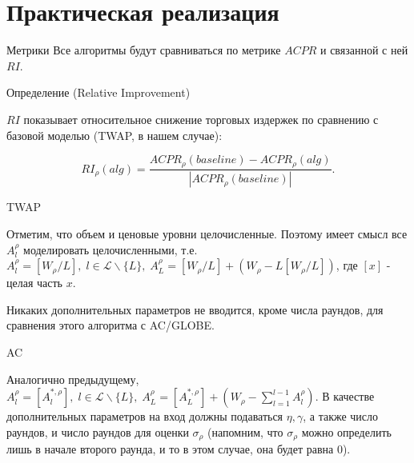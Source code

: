 \documentclass[aspectratio=169]{beamer}
\begin{document}
    \section{Практическая реализация}

        \begin{frame}{Метрики}
            Все алгоритмы будут сравниваться по метрике $ACPR$ и связанной с ней $RI$.

            \begin{block}{Определение (Relative Improvement)}

                $RI$ показывает относительное снижение торговых
                издержек по сравнению с базовой моделью (TWAP, в нашем случае):
        
                \begin{equation*}
                    RI_\rho(alg) = \frac{ACPR_\rho(baseline) - ACPR_{\rho}(alg)  }{|ACPR_\rho(baseline)|}.
                \end{equation*}
                
            \end{block}
            
        \end{frame}
        
        \begin{frame}{TWAP}
        
            Отметим, что объем и ценовые уровни целочисленные. Поэтому имеет смысл все $A^\rho_l$ моделировать целочисленными, т.е. $A^\rho_l = [W_\rho/L], \; l \in \mathcal L \backslash \{L\} , \; A^\rho_L = [W_\rho/L] + (W_\rho - L[W_\rho/L])$, где $[x]$ - целая часть $x$. 

            Никаких дополнительных параметров не вводится, кроме числа раундов, для сравнения этого алгоритма с AC/GLOBE.
            
        \end{frame}

        \begin{frame}{AC}

            Аналогично предыдущему, $A^\rho_l = [A_l^{*, \rho}], \; l \in \mathcal L \backslash \{L\} , \; A^\rho_L = [A_L^{*, \rho}] + (W_\rho - \sum\limits_{l=1}^{l-1}A_l^\rho )$. В качестве дополнительных параметров на вход должны подаваться $\eta, \gamma$, а также число раундов, и число раундов для оценки $\sigma_\rho$ (напомним, что $\sigma_\rho$ можно определить лишь в начале второго раунда, и то в этом случае, она будет равна 0). 

        \end{frame}
\end{document}
